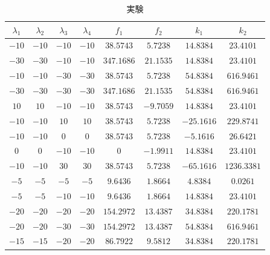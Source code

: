 \documentclass[12pt]{jsarticle}
\begin{document}
\begin{table}[tb]
  \begin{center}
    \label{TableB1-2}
    \caption{実験}
    \begin{tabular}{|c|c|c|c|c|c|c|c|} \hline
      $\lambda_1$ & $\lambda_2$ & $\lambda_3$ & $\lambda_4$  & $f_1$ & $f_2$ & $k_1$ & $k_2$\\ \hline \hline
      $-10$ & $-10$ & $-10$ & $-10$ & $38.5743$  & $5.7238$  & $14.8384$  & $23.4101$  \\ \hline
      $-30$ & $-30$ & $-10$ & $-10$ & $347.1686$ & $21.1535$ & $14.8384$  & $23.4101$  \\ \hline
      $-10$ & $-10$ & $-30$ & $-30$ & $38.5743$  & $5.7238$  & $54.8384$  & $616.9461$ \\ \hline
      $-30$ & $-30$ & $-30$ & $-30$ & $347.1686$ & $21.1535$ & $54.8384$  & $616.9461$ \\ \hline
       $10$ &  $10$ & $-10$ & $-10$ & $38.5743$  & $-9.7059$ & $14.8384$  & $23.4101$  \\ \hline
      $-10$ & $-10$ & $10$  &  $10$ & $38.5743$  & $5.7238$  & $-25.1616$ & $229.8741$ \\ \hline
      $-10$ & $-10$ & $0$   & $0$   & $38.5743$  & $5.7238$  & $-5.1616$  & $26.6421$  \\ \hline
      $0$   & $0$   & $-10$ & $-10$ & $0$        & $-1.9911$ & $14.8384$  & $23.4101$  \\ \hline
      $-10$ & $-10$ & $30$  & $30$  & $38.5743$  & $5.7238$  & $-65.1616$ & $1236.3381$\\ \hline
      $-5$  & $-5$  & $-5$  & $-5$  & $9.6436$   & $1.8664$  & $4.8384$   & $0.0261$   \\ \hline
      $-5$  & $-5$  & $-10$ & $-10$ & $9.6436$   & $1.8664$  & $14.8384$  & $23.4101$  \\ \hline
      $-20$ & $-20$ & $-20$ & $-20$ & $154.2972$ & $13.4387$ & $34.8384$  & $220.1781$ \\ \hline
      $-20$ & $-20$ & $-30$ & $-30$ & $154.2972$ & $13.4387$ & $54.8384$  & $616.9461$ \\ \hline
      $-15$ & $-15$ & $-20$ & $-20$ & $86.7922$  & $9.5812$  & $34.8384$  & $220.1781$ \\ \hline
    \end{tabular}
  \end{center}
\end{table}

\clearpage
\newpage
\newpage
\end{document}
